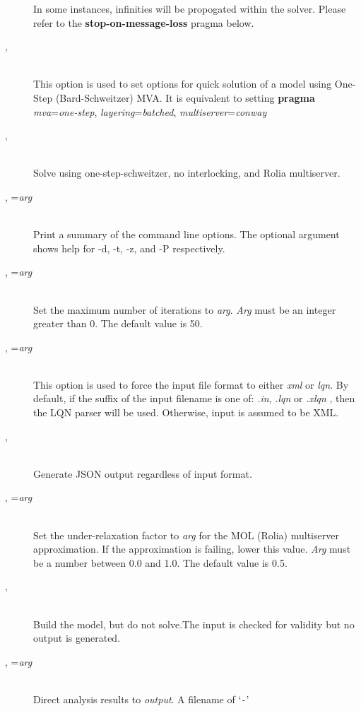 \begin{description}
In some instances, infinities  will be propogated within the solver.  Please refer to the
\textbf{stop-on-message-loss} pragma below.
\item[\flag{f}{}, \longopt{fast-linearizer}]~\\
This option is used to set options for quick solution of a model using One-Step (Bard-Schweitzer) MVA.
It is equivalent to setting \textbf{pragma} \emph{mva}=\emph{one-step}, \emph{layering}=\emph{batched}, \emph{multiserver}=\emph{conway}
\item[\flag{h}{}, \longopt{huge}]~\\
Solve using one-step-schweitzer, no interlocking, and Rolia multiserver.
\item[\flag{H}{}, \longopt{help}=\emph{arg}]~\\
Print a summary of the command line options.  The optional argument shows help for -d, -t, -z, and -P respectively.
\item[\flag{i}{}, \longopt{iteration-limit}=\emph{arg}]~\\
Set the maximum number of iterations to \emph{arg}.
\emph{Arg} must be an integer greater than 0.  The default value is 50.
\item[\flag{I}{}, \longopt{input-format}=\emph{arg}]~\\
This option is used to force the input file format to either \emph{xml} or \emph{lqn}.
By default, if the suffix of the input filename is one of: \emph{.in}, \emph{.lqn} or \emph{.xlqn}
, then the LQN parser will be used.  Otherwise, input is assumed to be XML.
\item[\flag{j}{}, \longopt{json}]~\\
Generate JSON output regardless of input format.
\item[\flag{M}{}, \longopt{mol-underrelaxation}=\emph{arg}]~\\
Set the under-relaxation factor to \emph{arg} for the MOL (Rolia) multiserver approximation.  If the approximation is failing, lower this value.
\emph{Arg} must be a number between 0.0 and 1.0.
The default value is 0.5.
\item[\flag{n}{}, \longopt{no-execute}]~\\
Build the model, but do not solve.The input is checked for validity but no output is generated.
\item[\flag{o}{}, \longopt{output}=\emph{arg}]~\\
Direct analysis results to \emph{output}.  A filename of `\texttt{-}'

\end{description}
